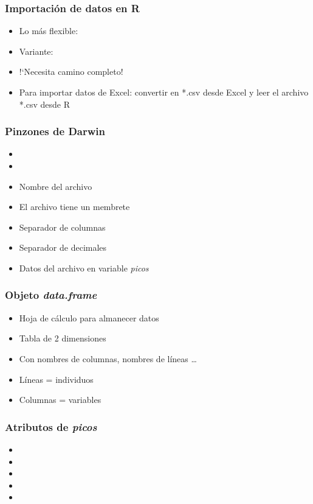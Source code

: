 \documentclass[mathserif]{beamer}
\begin{document}
\begin{frame}[plain,label=d19]%
\frametitle{Importaci\'on de datos en R}
\begin{itemize}
   \item Lo m\'as flexible: 
   \item Variante: 
   \item !`Necesita camino completo!
   \item Para importar datos de Excel: convertir en *.csv desde Excel y leer el archivo *.csv desde R
\end{itemize}
\end{frame}%

\begin{frame}[plain,label=d20]%
\frametitle{Pinzones de Darwin}
\begin{itemize}
   \item {}
   \item {}
   \item Nombre del archivo
   \item El archivo tiene un membrete
   \item Separador de columnas
   \item Separador de decimales
   \item Datos del archivo en variable \emph{picos}
\end{itemize}
\end{frame}%

\begin{frame}[plain,label=d21]%
\frametitle{Objeto \emph{data.frame}}
\begin{itemize}
   \item Hoja de c\'alculo para almanecer datos
   \item Tabla de 2 dimensiones 
   \item Con nombres de columnas, nombres de l\'ineas \ldots
   \item L\'ineas = individuos
   \item Columnas = variables
\end{itemize}
\end{frame}%

\begin{frame}[plain,label=d22]%
\frametitle{Atributos de \emph{picos}}
\begin{itemize}
\item {}
\item {}
\item {}
\item {}
\item {}
\end{itemize}
\end{frame}%
\end{document}
